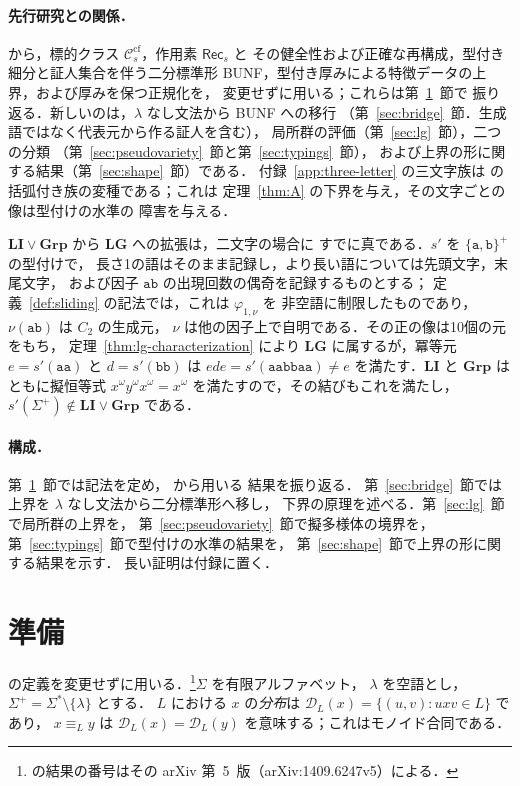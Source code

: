 \documentclass[11pt,a4paper]{ltjsarticle}
\numberwithin{equation}{section}
\theoremstyle{plain}
\theoremstyle{definition}
\theoremstyle{remark}
\theoremstyle{plain}
\newcommand{\cf}{\mathrm{cf}}
\newcommand{\Ccf}[1]{\mathcal C_{#1}^{\cf}}
\newcommand{\Rec}{\mathsf{Rec}}
\newcommand{\D}{\mathcal{D}}
\newcommand{\LG}{\mathbf{LG}}
\begin{document}
\paragraph{先行研究との関係．}
\cite{kuriyamaCFG} から，標的クラス $\Ccf{s}$，作用素 $\Rec_s$ と
その健全性および正確な再構成，型付き細分と証人集合を伴う二分標準形
BUNF，型付き厚みによる特徴データの上界，および厚みを保つ正規化を，
変更せずに用いる；これらは第~\ref{sec:prelim}~節で
振り返る．新しいのは，$\lambda$ なし文法から BUNF への移行
（第~\ref{sec:bridge}~節．生成語ではなく代表元から作る証人を含む），
局所群の評価（第~\ref{sec:lg}~節），二つの分類
（第~\ref{sec:pseudovariety}~節と第~\ref{sec:typings}~節），
および上界の形に関する結果（第~\ref{sec:shape}~節）である．
付録~\ref{app:three-letter} の三文字族は
\cite[命題~6.4]{kuriyamaCFG} の括弧付き族の変種である；これは
定理~\ref{thm:A} の下界を与え，その文字ごとの像は型付けの水準の
障害を与える．

$\mathbf{LI}\vee\mathbf{Grp}$ から $\LG$ への拡張は，二文字の場合に
すでに真である．$s'$ を $\{\mathtt a,\mathtt b\}^+$ の型付けで，
長さ1の語はそのまま記録し，より長い語については先頭文字，末尾文字，
および因子 $\mathtt{ab}$ の出現回数の偶奇を記録するものとする；
定義~\ref{def:sliding} の記法では，これは $\varphi_{1,\nu}$ を
非空語に制限したものであり，$\nu(\mathtt{ab})$ は $C_2$ の生成元，
$\nu$ は他の因子上で自明である．その正の像は10個の元をもち，
定理~\ref{thm:lg-characterization} により $\LG$ に属するが，冪等元
$e=s'(\mathtt{aa})$ と $d=s'(\mathtt{bb})$ は
$ede=s'(\mathtt{aabbaa})\ne e$ を満たす．$\mathbf{LI}$ と
$\mathbf{Grp}$ はともに擬恒等式 $x^\omega y^\omega x^\omega=x^\omega$
を満たすので，その結びもこれを満たし，
$s'(\Sigma^+)\notin\mathbf{LI}\vee\mathbf{Grp}$ である．

\paragraph{構成．}
第~\ref{sec:prelim}~節では記法を定め，\cite{kuriyamaCFG} から用いる
結果を振り返る．
第~\ref{sec:bridge}~節では上界を $\lambda$ なし文法から二分標準形へ移し，
下界の原理を述べる．第~\ref{sec:lg}~節で局所群の上界を，
第~\ref{sec:pseudovariety}~節で擬多様体の境界を，
第~\ref{sec:typings}~節で型付けの水準の結果を，
第~\ref{sec:shape}~節で上界の形に関する結果を示す．
長い証明は付録に置く．

\section{準備}
\label{sec:prelim}
\cite{kuriyamaCFG} の定義を変更せずに用いる．\footnote{\cite{kuriyamaCFG}
の結果の番号はその arXiv 第~5~版（arXiv:1409.6247v5）による．}$\Sigma$ を有限アルファベット，
$\lambda$ を空語とし，$\Sigma^+=\Sigma^*\setminus\{\lambda\}$ とする．
$L$ における $x$ の\emph{分布}は $\D_L(x)=\{(u,v):uxv\in L\}$ であり，
$x\equiv_L y$ は $\D_L(x)=\D_L(y)$ を意味する；これはモノイド合同である．
\end{document}

